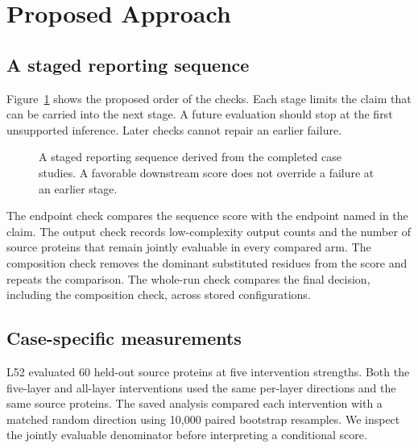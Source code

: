 \documentclass{article}
\begin{document}
\section{Proposed Approach}
\label{sec:approach}

\subsection{A staged reporting sequence}

Figure~\ref{fig:audit} shows the proposed order of the checks. Each stage
limits the claim that can be carried into the next stage. A future evaluation
should stop at the first unsupported inference. Later checks cannot repair an
earlier failure.

\FloatBarrier
\begin{figure}[htbp]
\centering
\small
{}
\hfill
{}
\hfill
{}
\hfill
{}
\caption{A staged reporting sequence derived from the completed case studies.
A favorable downstream score does not override a failure at an earlier stage.}
\label{fig:audit}
\end{figure}
\FloatBarrier

The endpoint check compares the sequence score with the endpoint named in
the claim. The output check records low-complexity output counts and the number
of source proteins that remain jointly evaluable in every compared arm. The
composition check removes the dominant substituted residues from the score and
repeats the comparison. The whole-run check compares the final decision,
including the composition check, across stored configurations.

\subsection{Case-specific measurements}

L52 evaluated 60 held-out source proteins at five intervention strengths.
Both the five-layer and all-layer interventions used the same per-layer
directions and the same source proteins. The saved analysis compared each
intervention with a matched random direction using 10,000 paired bootstrap
resamples. We inspect the jointly evaluable denominator before interpreting a
conditional score.
\end{document}
